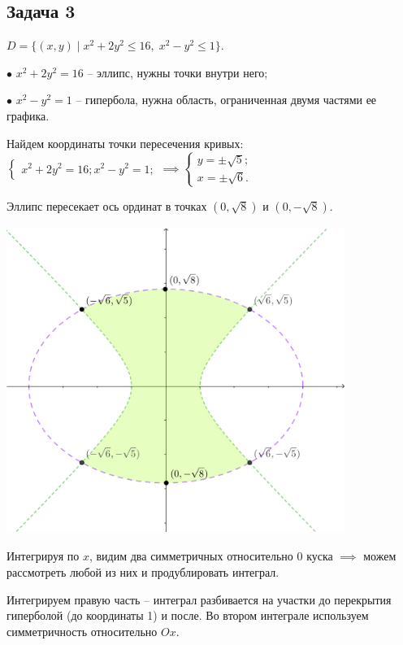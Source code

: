 \documentclass[a4paper, fleqn]{article}
\begin{document}
    \subsection*{Задача 3}
    
    $D = \{ (x,y ) \mid x^2 + 2 y^2 \leq 16, \; x^2 - y^2 \leq 1\}.$
    
    
    $\bullet$ $ x^2 + 2 y^2 = 16$ -- эллипс, нужны точки внутри него;
    
    $\bullet$ $x^2 - y^2 = 1$ -- гипербола, нужна область, ограниченная двумя частями ее графика. 
    
    
    Найдем координаты точки пересечения кривых: $\begin{cases} x ^ 2 + 2 y^2 = 16;
    x^2  - y^2 = 1;\end{cases} \implies \begin{cases} y = \pm \sqrt{5}; \\ x = \pm \sqrt{6} .\end{cases}$
    
    Эллипс пересекает ось ординат в точках $(0, \sqrt{8})$ и $(0, -\sqrt{8}).$ 
    
    \includegraphics[width=11cm, height=10cm]{task 3.png}
    
    
    Интегрируя по $x$, видим два симметричных относительно 0 куска $\implies$ можем рассмотреть любой из них и продублировать интеграл.
    
    Интегрируем правую часть -- интеграл разбивается на участки до перекрытия гиперболой (до координаты 1) и после. Во втором интеграле используем симметричность относительно $Ox.$
    
\end{document}
